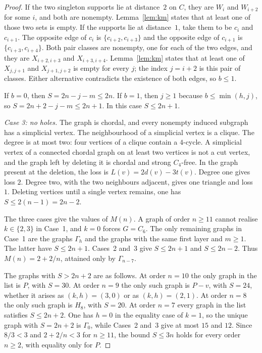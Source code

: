 \documentclass[ASNA]{USG}
\theoremstyle{WBstyletwo}
\numberwithin{equation}{section}
\begin{document}
\begin{proof}
If the two singleton supports lie at distance~$2$ on $C$, they are $W_i$ and $W_{i+2}$ for some $i$, and both are nonempty. Lemma~\ref{lem:km} states that at least one of those two sets is empty. If the supports lie at distance~$1$, take them to be $c_i$ and $c_{i+1}$. The opposite edge of $c_i$ is $\{c_{i+2},c_{i+3}\}$ and the opposite edge of $c_{i+1}$ is $\{c_{i+3},c_{i+4}\}$. Both pair classes are nonempty, one for each of the two edges, and they are $X_{i+2,i+3}$ and $X_{i+3,i+4}$. Lemma~\ref{lem:km} states that at least one of $X_{j,j+1}$ and $X_{j+1,j+2}$ is empty for every $j$; the index $j=i+2$ is this pair of classes. Either alternative contradicts the existence of both edges, so $b\le 1$.

If $b=0$, then $S=2n-j-m\le 2n$. If $b=1$, then $j\ge 1$ because $b\le\min(h,j)$, so $S=2n+2-j-m\le 2n+1$. In this case $S\le 2n+1$.

\emph{Case 3: no holes.}
The graph is chordal, and every nonempty induced subgraph has a simplicial vertex. The neighbourhood of a simplicial vertex is a clique. The degree is at most two: four vertices of a clique contain a $4$-cycle. A simplicial vertex of a connected chordal graph on at least two vertices is not a cut vertex, and the graph left by deleting it is chordal and strong $C_4$-free. In the graph present at the deletion, the loss is $L(v)=2d(v)-3t(v)$. Degree one gives loss $2$. Degree two, with the two neighbours adjacent, gives one triangle and loss $1$. Deleting vertices until a single vertex remains, one has $S\le 2(n-1)=2n-2$.

The three cases give the values of $M(n)$. A graph of order $n\ge 11$ cannot realise $k\in\{2,3\}$ in Case~1, and $k=0$ forces $G=C_6$. The only remaining graphs in Case~1 are the graphs $\Gamma_h$ and the graphs with the same first layer and $m\ge 1$. The latter have $S\le 2n+1$. Cases~2 and~3 give $S\le 2n+1$ and $S\le 2n-2$. Thus $M(n)=2+2/n$, attained only by $\Gamma_{n-7}$.

The graphs with $S>2n+2$ are as follows. At order $n=10$ the only graph in the list is $P$, with $S=30$. At order $n=9$ the only such graph is $P-v$, with $S=24$, whether it arises as $(k,h)=(3,0)$ or as $(k,h)=(2,1)$. At order $n=8$ the only such graph is $H_8$, with $S=20$. At order $n=7$ every graph in the list satisfies $S\le 2n+2$. One has $h=0$ in the equality case of $k=1$, so the unique graph with $S=2n+2$ is $\Gamma_0$, while Cases~2 and~3 give at most $15$ and $12$. Since $8/3<3$ and $2+2/n<3$ for $n\ge 11$, the bound $S\le 3n$ holds for every order $n\ge 2$, with equality only for $P$.


\end{proof}
\end{document}
